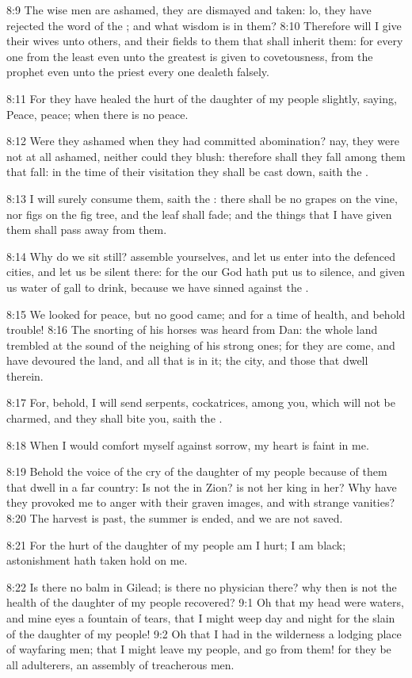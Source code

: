 8:9 The wise men are ashamed, they are dismayed and taken: lo, they
have rejected the word of the \LORD; and what wisdom is in them?  8:10
Therefore will I give their wives unto others, and their fields to
them that shall inherit them: for every one from the least even unto
the greatest is given to covetousness, from the prophet even unto the
priest every one dealeth falsely.

8:11 For they have healed the hurt of the daughter of my people
slightly, saying, Peace, peace; when there is no peace.

8:12 Were they ashamed when they had committed abomination? nay, they
were not at all ashamed, neither could they blush: therefore shall
they fall among them that fall: in the time of their visitation they
shall be cast down, saith the \LORD.

8:13 I will surely consume them, saith the \LORD: there shall be no
grapes on the vine, nor figs on the fig tree, and the leaf shall fade;
and the things that I have given them shall pass away from them.

8:14 Why do we sit still? assemble yourselves, and let us enter into
the defenced cities, and let us be silent there: for the \LORD our God
hath put us to silence, and given us water of gall to drink, because
we have sinned against the \LORD.

8:15 We looked for peace, but no good came; and for a time of health,
and behold trouble!  8:16 The snorting of his horses was heard from
Dan: the whole land trembled at the sound of the neighing of his
strong ones; for they are come, and have devoured the land, and all
that is in it; the city, and those that dwell therein.

8:17 For, behold, I will send serpents, cockatrices, among you, which
will not be charmed, and they shall bite you, saith the \LORD.

8:18 When I would comfort myself against sorrow, my heart is faint in
me.

8:19 Behold the voice of the cry of the daughter of my people because
of them that dwell in a far country: Is not the \LORD in Zion? is not
her king in her? Why have they provoked me to anger with their graven
images, and with strange vanities?  8:20 The harvest is past, the
summer is ended, and we are not saved.

8:21 For the hurt of the daughter of my people am I hurt; I am black;
astonishment hath taken hold on me.

8:22 Is there no balm in Gilead; is there no physician there? why then
is not the health of the daughter of my people recovered?  9:1 Oh that
my head were waters, and mine eyes a fountain of tears, that I might
weep day and night for the slain of the daughter of my people!  9:2 Oh
that I had in the wilderness a lodging place of wayfaring men; that I
might leave my people, and go from them! for they be all adulterers,
an assembly of treacherous men.

